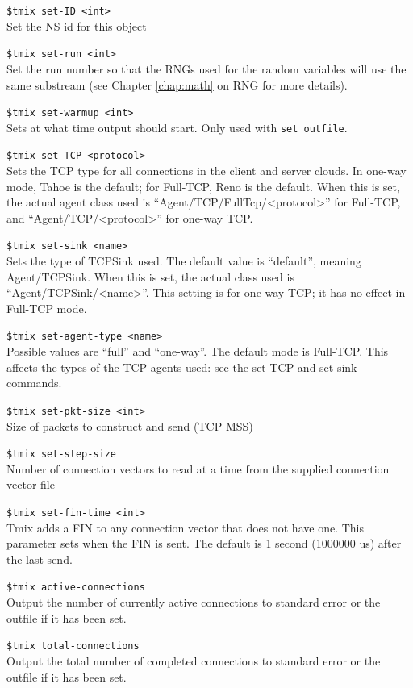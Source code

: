 {\tt \$tmix set-ID <int>}\\
Set the NS id for this object

{\tt \$tmix set-run <int>}\\
Set the run number so that the RNGs used for the random variables will
use the same substream (see Chapter \ref{chap:math} on RNG for more details).

{\tt \$tmix set-warmup <int>}\\
Sets at what time output should start.  Only used with {\tt set outfile}.

{\tt \$tmix set-TCP <protocol>}\\
Sets the TCP type for all connections in the client and server clouds. In one-way mode, Tahoe is the default; for Full-TCP, Reno is the default. When this is set, the actual agent class used is ``Agent/TCP/FullTcp/<protocol>'' for Full-TCP, and ``Agent/TCP/<protocol>'' for one-way TCP.

{\tt \$tmix set-sink <name>}\\
Sets the type of TCPSink used. The default value is ``default'', meaning Agent/TCPSink. When this is set, the actual class used is ``Agent/TCPSink/<name>''. This setting is for one-way TCP; it has no effect in Full-TCP mode.

{\tt \$tmix set-agent-type <name>}\\
Possible values are ``full'' and ``one-way''. The default mode is Full-TCP. This affects the types of the TCP agents used: see the set-TCP and set-sink commands.

{\tt \$tmix set-pkt-size <int>}\\
Size of packets to construct and send (TCP MSS)

{\tt \$tmix set-step-size}\\
Number of connection vectors to read at a time from the supplied connection vector file

{\tt \$tmix set-fin-time <int>}\\
Tmix adds a FIN to any connection vector that does not have one. This
parameter sets when the FIN is sent. The default is 1 second (1000000 us) 
after the last send.

{\tt \$tmix active-connections}\\
Output the number of currently active connections to standard error or the
outfile if it has been set.

{\tt \$tmix total-connections}\\
Output the total number of completed connections to standard error or
the outfile if it has been set.

